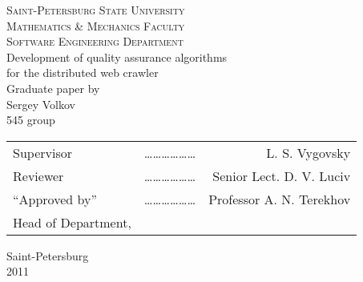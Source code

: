 \documentclass[a4paper,10pt]{report}
\begin{document}
\begin{titlepage}
\begin{center}
\begin{otherlanguage}{english}

\textsc{Saint-Petersburg State University}\\
\textsc{Mathematics \& Mechanics Faculty}\\[1.0cm]

\textsc{Software Engineering Department}\\[3.0cm]

{ \LARGE Development of quality assurance algorithms}\\[1.0cm]

{ \LARGE for the distributed web crawler}\\[1.0cm]

{Graduate paper by \\ Sergey Volkov \\ 545 group}\\[3.0cm]

\begin{tabular}{lcr}
Supervisor & ……………… & L. S. Vygovsky \\[1.0cm]
Reviewer            & ……………… & Senior Lect. D. V. Luciv\\[1.0cm]
``Approved by'' & ……………… & Professor A. N. Terekhov\\
Head of Department, & & \\
\end{tabular}

\vfill

{\large Saint-Petersburg \\ 2011}

\end{otherlanguage}
\end{center}
\end{titlepage}

\tableofcontents






\end{document}
